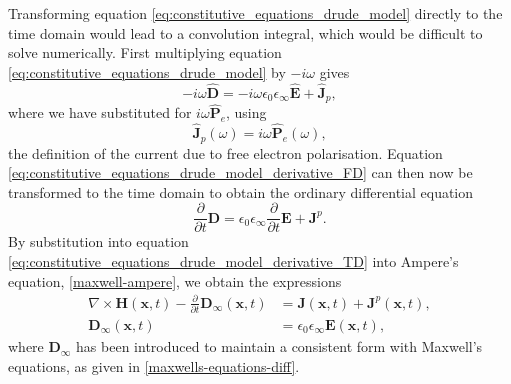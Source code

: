 Transforming equation \ref{eq:constitutive_equations_drude_model} directly to the time domain would lead to a convolution integral, which would be difficult to solve numerically. First multiplying equation \ref{eq:constitutive_equations_drude_model} by $ -i \omega$ gives
\begin{equation}
\label{eq:constitutive_equations_drude_model_derivative_FD}
- i \omega \hat{\mathbf{D}} = -i \omega \epsilon_0 \epsilon_{\infty} \hat{\mathbf{E}} + \hat{\mathbf{J}}_p,
\end{equation}
where we have substituted for $i \omega \hat{\mathbf{P}}_e$, using
\begin{equation}
\label{eq:drude-free-elect-current-defn}
\hat{\mathbf{J}}_p(\omega) = i \omega \hat{\mathbf{P}}_e(\omega) ,
\end{equation}
the definition of the current due to free electron polarisation.
Equation \ref{eq:constitutive_equations_drude_model_derivative_FD} can then now be transformed to the time domain to obtain the ordinary differential equation
\begin{equation}
\label{eq:constitutive_equations_drude_model_derivative_TD}
\frac{\partial}{\partial t} \mathbf{D} = \epsilon_0 \epsilon_{\infty} \frac{\partial}{\partial t} \mathbf{E} + \mathbf{J}^p .
\end{equation}
By substitution into equation \ref{eq:constitutive_equations_drude_model_derivative_TD} into Ampere's equation, \ref{maxwell-ampere}, we obtain the expressions
\begin{subequations}
\label{eq:drude-ampere}
    \begin{align}
        \nabla \times \mathbf{H}(\mathbf{x},t) - \frac{\partial }{\partial t} \mathbf{D}_{\infty}(\mathbf{x}, t) &= \mathbf{J}(\mathbf{x},t) + \mathbf{J}^p(\mathbf{x},t) , \\
        \mathbf{D}_{\infty}(\mathbf{x}, t) &= \epsilon_0 \epsilon_{\infty} \mathbf{E}(\mathbf{x}, t),
    \end{align}
\end{subequations}
where $\mathbf{D}_{\infty}$ has been introduced to maintain a consistent form with Maxwell's equations, as given in \ref{maxwells-equations-diff}.

